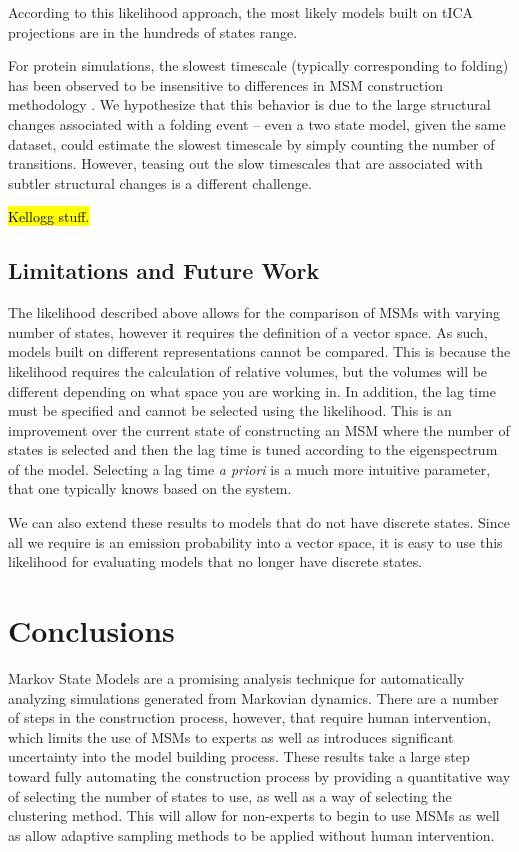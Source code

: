 \documentclass[twocolumn,floatfix,nofootinbib,aps]{revtex4-1}
\begin{document}
According to this likelihood approach, the most likely models built on tICA projections are in the hundreds of states range. 

For protein simulations, the slowest timescale (typically corresponding to folding) has been observed to be insensitive to differences in MSM construction methodology \cite{McGibbon2013Learning, others?}. We hypothesize that this behavior is due to the large structural changes associated with a folding event -- even a two state model, given the same dataset, could estimate the slowest timescale by simply counting the number of transitions. However, teasing out the slow timescales that are associated with subtler structural changes is a different challenge. 

\hl{Kellogg stuff.}

\subsection{Limitations and Future Work}

The likelihood described above allows for the comparison of MSMs with varying number of states, however it requires the definition of a vector space. As such, models built on different representations cannot be compared. This is because the likelihood requires the calculation of relative volumes, but the volumes will be different depending on what space you are working in. In addition, the lag time must be specified and cannot be selected using the likelihood. This is an improvement over the current state of constructing an MSM where the number of states is selected and then the lag time is tuned according to the eigenspectrum of the model. Selecting a lag time {\it a priori} is a much more intuitive parameter, that one typically knows based on the system.

We can also extend these results to models that do not have discrete states. Since all we require is an emission probability into a vector space, it is easy to use this likelihood for evaluating models that no longer have discrete states.

\section{Conclusions}

Markov State Models are a promising analysis technique for automatically analyzing simulations generated from Markovian dynamics. There are a number of steps in the construction process, however, that require human intervention, which limits the use of MSMs to experts as well as introduces significant uncertainty into the model building process. These results take a large step toward fully automating the construction process by providing a quantitative way of selecting the number of states to use, as well as a way of selecting the clustering method. This will allow for non-experts to begin to use MSMs as well as allow adaptive sampling methods to be applied without human intervention.


\end{document}
